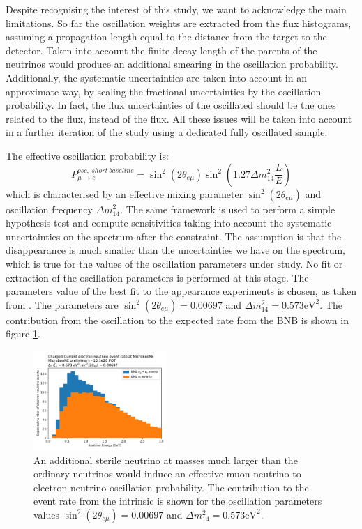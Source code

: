Despite recognising the interest of this study, we want to acknowledge the main limitations.
So far the oscillation weights are extracted from the flux histograms, assuming a propagation length equal to the distance from the target to the detector.
Taken into account the finite decay length of the parents of the neutrinos would produce an additional smearing in the oscillation probability.
Additionally, the systematic uncertainties are taken into account in an approximate way, by scaling the fractional uncertainties by the oscillation probability.
In fact, the flux uncertainties of the oscillated \nue should be the ones related to the \numu flux, instead of the \nue flux.
All these issues will be taken into account in a further iteration of the study using a dedicated fully oscillated sample.

 
The effective oscillation probability is:
\begin{equation}
\label{eqn:osc_probability}
P^{osc,~short~baseline}_{\mu \rightarrow e} = \sin^2(2\theta_{e\mu})\sin^2\left(1.27 \Delta m^2_{14} \frac{L}{E}\right)
\end{equation}
which  is  characterised  by  an  effective  mixing  parameter  $\sin^2(2\theta_{e\mu})$  and  oscillation  frequency  $\Delta m^2_{14}$.   
The same framework is used to perform a simple hypothesis test and compute sensitivities taking into account the systematic uncertainties on the \nue spectrum after the \numu constraint.  
The assumption is that the \numu disappearance is much smaller than the uncertainties we have on the \numu spectrum, which is true for the values of the oscillation parameters under study.  
No fit or extraction of the oscillation parameters is performed at this stage.  
The parameters value of the best fit to the appearance experiments is chosen, as taken from \cite{bib:oscillation_parameters}.  
The parameters are $\sin^2(2\theta_{e\mu}) = 0.00697$ and $\Delta m^2_{14} = 0.573 \text{eV}^2$.  
The contribution from the oscillation to the expected \nue rate from the BNB is shown in figure \ref{fig:oscillation_event_rate}.


\begin{figure}[ht] 
\centering
\includegraphics[width=0.45\textwidth]{Sensitivity/oscillation/event_rate_nueccpinp_deltam2_0573_sin2theta2_000697.pdf}
\caption{An additional sterile neutrino at masses much larger than the ordinary neutrinos would induce an effective muon neutrino to electron neutrino oscillation probability. The contribution to the event rate from the \nue intrinsic is shown for the oscillation parameters values $\sin^2(2\theta_{e\mu}) = 0.00697$ and $\Delta m^2_{14} = 0.573 \text{eV}^2$.}
\label{fig:oscillation_event_rate}
\end{figure}



